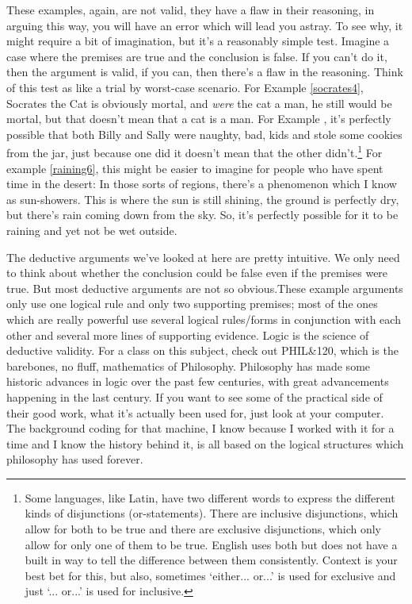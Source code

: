 These examples, again, are not valid, they have a flaw in their reasoning, in arguing this way, you will have an error which will lead you astray. To see why, it might require a bit of imagination, but it's a reasonably simple test. Imagine a case where the premises are true and the conclusion is false. If you can't do it, then the argument is valid, if you can, then there's a flaw in the reasoning. Think of this test as like a trial by worst-case scenario. For Example \ref{socrates4}, Socrates the Cat is obviously mortal, and \emph{were} the cat a man, he still would be mortal, but that doesn't mean that a cat is a man. For Example , it's perfectly possible that both Billy and Sally were naughty, bad, kids and stole some cookies from the jar, just because one did it doesn't mean that the other didn't.\footnote{Some languages, like Latin, have two different words to express the different kinds of disjunctions (or-statements). There are inclusive disjunctions, which allow for both to be true and there are exclusive disjunctions, which only allow for only one of them to be true. English uses both but does not have a built in way to tell the difference between them consistently. Context is your best bet for this, but also, sometimes `either... or...' is used for exclusive and just `... or...' is used for inclusive.} For example \ref{raining6}, this might be easier to imagine for people who have spent time in the desert: In those sorts of regions, there's a phenomenon which I know as sun-showers. This is where the sun is still shining, the ground is perfectly dry, but there's rain coming down from the sky. So, it's perfectly possible for it to be raining and yet not be wet outside.

The deductive arguments we’ve looked at here are pretty intuitive. We only need to think about whether the conclusion could be false even if the premises were true. But most deductive arguments are not so obvious.These example arguments only use one logical rule and only two supporting premises; most of the ones which are really powerful use several logical rules/forms in conjunction with each other and several more lines of supporting evidence.  Logic is the science of deductive validity. For a class on this subject, check out PHIL\&120, which is the barebones, no fluff, mathematics of Philosophy. Philosophy has made some historic advances in logic over the past few centuries, with great advancements happening in the last century.  If you want to see some of the practical side of their good work, what it's actually been used for, just look at your computer. The background coding for that machine, I know because I worked with it for a time and I know the history behind it, is all based on the logical structures which philosophy has used forever.

